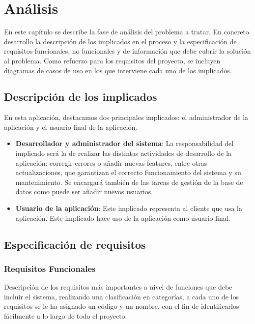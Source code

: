 
\chapter{Análisis}

En este capítulo se describe la fase de análisis del problema a tratar. En concreto desarrollo la descripción de los implicados en el proceso y la especificación de requisitos funcionales, no funcionales y de información que debe cubrir la solución al problema. Como refuerzo para los requisitos del proyecto, se incluyen diagramas de casos de uso en los que interviene cada uno de los implicados.\newline

\section{Descripción de los implicados} \label{implicados}

En esta aplicación, destacamos dos principales implicados: el administrador de la aplicación y el usuario final de la aplicación.

\begin{itemize}
	\item \textbf{Desarrollador y administrador del sistema}: La responsabilidad del implicado será la de realizar las distintas actividades de desarrollo de la aplicación: corregir errores o añadir nuevas features, entre otras actualizaciones, que garantizan el correcto funcionamiento del sistema y su mantenimiento. Se encargará también de las tareas de gestión de la base de datos como puede ser añadir nuevos usuarios.
	
	\item \textbf{Usuario de la aplicación}: Este implicado representa al cliente que usa la aplicación. Este implicado hace uso de la aplicación como usuario final.
\end{itemize}

\section{Especificación de requisitos}

\subsection{Requisitos Funcionales}

Descripción de los requisitos más importantes a nivel de funciones que debe incluir el sistema, realizando una clasificación en categorías, a cada uno de los requisitos se le ha asignado un código y un nombre, con el fin de identificarlos fácilmente a lo largo de todo el proyecto. 

